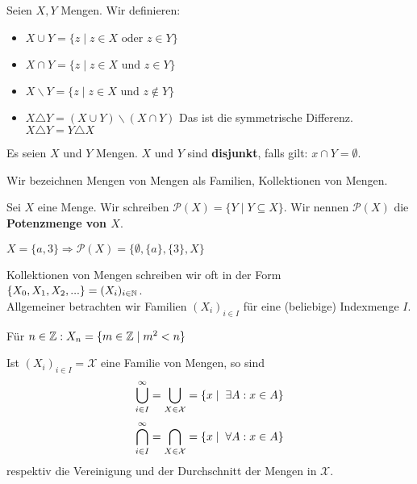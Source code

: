 \documentclass[main.tex]{subfiles}
\begin{document}
\begin{Definition}[Mengenoperationen]
  Seien $X,Y$ Mengen. Wir definieren:
  \begin{itemize}
    \item $ X \cup Y = \{ z \mid z \in X \text{ oder } z \in Y \} $
    \item $ X \cap Y = \{ z \mid z \in X \text{ und } z \in Y \} $
    \item $ X \backslash Y = \{ z \mid z \in X \text{ und } z \notin Y \} $
    \item $ X \triangle Y = (X \cup Y) \backslash (X \cap Y) $
    Das ist die symmetrische Differenz. $ X \triangle Y = Y \triangle X $
  \end{itemize}
\end{Definition}

\begin{Definition}
  Es seien $X$ und $Y$ Mengen.  $X$ und $Y$ sind \textbf{disjunkt}, falls gilt: $x\cap Y = \emptyset$.
\end{Definition}

\begin{Definition}
  Wir bezeichnen Mengen von Mengen als Familien, Kollektionen von Mengen.
\end{Definition}

\begin{Definition}[Potenzmenge]
  Sei $X$ eine Menge. Wir schreiben $\mathcal{P}(X) = \{ Y \mid Y \subseteq X\} $. Wir nennen $\mathcal{P}(X)$ die \textbf{Potenzmenge von $X$}.
\end{Definition}

\begin{Beispiel}
  $X = \{ a,3 \} \Rightarrow \mathcal{P}(X)= \{ \emptyset, \{a\},\{3\},X\} $
\end{Beispiel}

Kollektionen von Mengen schreiben wir oft in der Form $\{ X_0 , X_1 , X_2 , ... \} = (X_i)_{i\in \mathbb{N} }$.\\
Allgemeiner betrachten wir Familien $(X_i)_{i\in I }$ für eine (beliebige) Indexmenge $I$.

\begin{Beispiel}
  Für $n\in \mathbb{Z} : X_n = \{ m \in \mathbb{Z} \mid m^2 < n \}$
\end{Beispiel}

\begin{Definition}
  Ist $(X_i)_{i\in I} = \mathcal{X}$ eine Familie von Mengen, so sind
  $$\bigcup_{i \in I}^\infty = \bigcup_{X \in \mathcal{X}} =  \{ x \mid \;\exists A : x\in A \} $$
  $$\bigcap_{i \in I}^\infty = \bigcap_{X \in \mathcal{X}} =  \{ x \mid \;\forall A : x\in A \} $$
  respektiv die Vereinigung und der Durchschnitt der Mengen in $\mathcal{X}$.
\end{Definition}
\end{document}
